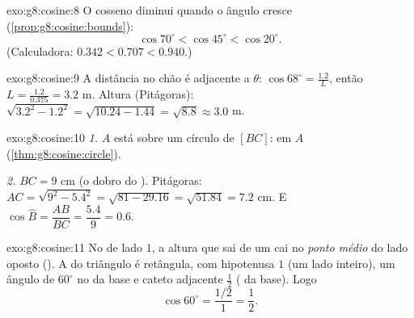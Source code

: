 \begin{solution}{exo:g8:cosine:8}
O cosseno diminui quando o ângulo cresce
(\cref{prop:g8:cosine:bounds}):
\[
\cos 70^\circ < \cos 45^\circ < \cos 20^\circ .
\]
(Calculadora: $0.342 < 0.707 < 0.940$.)
\end{solution}

\begin{solution}{exo:g8:cosine:9}
A distância no chão é adjacente a $\theta$:
$\cos 68^\circ = \frac{1.2}{L}$, então
$L = \frac{1.2}{0.375} = 3.2$ m. Altura (Pitágoras):
$\sqrt{3.2^2 - 1.2^2} = \sqrt{10.24 - 1.44} = \sqrt{8.8} \approx 3.0$
m.
\end{solution}

\begin{solution}{exo:g8:cosine:10}
\emph{1.} $A$ está sobre um círculo de  $[BC]$:  em
$A$ (\cref{thm:g8:cosine:circle}).

\emph{2.} $BC = 9$ cm (o dobro do ). Pitágoras:
$AC = \sqrt{9^2 - 5.4^2} = \sqrt{81 - 29.16} = \sqrt{51.84} = 7.2$ cm.
E $\cos\widehat B = \dfrac{AB}{BC} = \dfrac{5.4}{9} = 0.6$.
\end{solution}

\begin{solution}{exo:g8:cosine:11}
No  de lado $1$, a altura que sai de um  cai
no \emph{ponto médio} do lado oposto (). A  do
triângulo é retângula, com hipotenusa $1$ (um lado inteiro), um ângulo
de $60^\circ$ no  da base e cateto adjacente $\frac12$ (
da base). Logo
\[
\cos 60^\circ = \frac{1/2}{1} = \frac12 .
\]
\end{solution}

